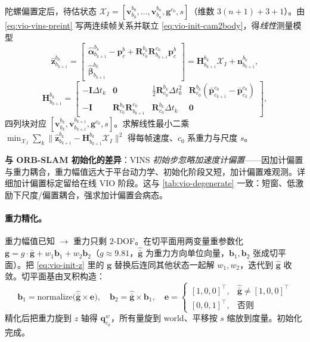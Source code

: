 陀螺偏置定后，待估状态 $\mathcal{X}_I=[\mathbf{v}^{b_0}_{b_0},\dots,\mathbf{v}^{b_n}_{b_n},\mathbf{g}^{c_0},s]$（维数 $3(n+1)+3+1$）。由 \cref{eq:vio-vins-preint} 写两连续帧关系并联立 \cref{eq:vio-init-cam2body}，得\emph{线性}测量模型
\begin{equation}
  \hat{\mathbf{z}}^{b_k}_{b_{k+1}}=\begin{bmatrix}\hat{\boldsymbol{\alpha}}^{b_k}_{b_{k+1}}-\mathbf{p}^b_c+\mathbf{R}^{b_k}_{c_0}\mathbf{R}^{c_0}_{b_{k+1}}\mathbf{p}^b_c\\ \hat{\boldsymbol{\beta}}^{b_k}_{b_{k+1}}\end{bmatrix}=\mathbf{H}^{b_k}_{b_{k+1}}\mathcal{X}_I+\mathbf{n}^{b_k}_{b_{k+1}},
  \label{eq:vio-init-z}
\end{equation}
\begin{equation}
  \mathbf{H}^{b_k}_{b_{k+1}}=\begin{bmatrix}
  -\mathbf{I}\Delta t_k&\mathbf{0}&\tfrac12\mathbf{R}^{b_k}_{c_0}\Delta t_k^2&\mathbf{R}^{b_k}_{c_0}(\bar{\mathbf{p}}^{c_0}_{c_{k+1}}-\bar{\mathbf{p}}^{c_0}_{c_k})\\
  -\mathbf{I}&\mathbf{R}^{b_k}_{c_0}\mathbf{R}^{c_0}_{b_{k+1}}&\mathbf{R}^{b_k}_{c_0}\Delta t_k&\mathbf{0}
  \end{bmatrix},
  \label{eq:vio-init-H}
\end{equation}
四列块对应 $[\mathbf{v}^{b_k}_{b_k},\mathbf{v}^{b_{k+1}}_{b_{k+1}},\mathbf{g}^{c_0},s]$。求解线性最小二乘 $\min_{\mathcal{X}_I}\sum_k\|\hat{\mathbf{z}}^{b_k}_{b_{k+1}}-\mathbf{H}^{b_k}_{b_{k+1}}\mathcal{X}_I\|^2$ 得每帧速度、$c_0$ 系重力与尺度 $s$。

\begin{note}
\textbf{与 ORB-SLAM 初始化的差异}：VINS \emph{初始步忽略加速度计偏置}——因加计偏置与重力耦合，重力幅值远大于平台动力学、初始化阶段又短，加计偏置难观测\cite{qin2018vins}。详细加计偏置标定留给在线 VIO 阶段。这与 \cref{tab:vio-degenerate} 一致：短窗、低激励下尺度/偏置耦合，强求加计偏置会病态。
\end{note}

\paragraph{重力精化。}
重力幅值已知 $\to$ 重力只剩 $2$-DOF。在切平面用两变量重参数化 $\mathbf{g}=g\cdot\hat{\bar{\mathbf{g}}}+w_1\mathbf{b}_1+w_2\mathbf{b}_2$（$g\approx9.81$，$\hat{\bar{\mathbf{g}}}$ 为重力方向单位向量，$\mathbf{b}_1,\mathbf{b}_2$ 张成切平面）。把 \cref{eq:vio-init-z} 里的 $\mathbf{g}$ 替换后连同其他状态一起解 $w_1,w_2$，迭代到 $\hat{\mathbf{g}}$ 收敛。切平面基由叉积构造：
\begin{equation}
  \mathbf{b}_1=\mathrm{normalize}\big(\hat{\bar{\mathbf{g}}}\times\mathbf{e}\big),
  \quad
  \mathbf{b}_2=\hat{\bar{\mathbf{g}}}\times\mathbf{b}_1,
  \quad
  \mathbf{e}=\begin{cases}[1,0,0]^\top,&\hat{\bar{\mathbf{g}}}\neq[1,0,0]^\top\\ [0,0,1]^\top,&\text{否则}\end{cases}
  \label{eq:vio-init-tangent}
\end{equation}
精化后把重力旋到 $z$ 轴得 $\mathbf{q}^w_{c_0}$，所有量旋到 world、平移按 $s$ 缩放到度量。初始化完成。

